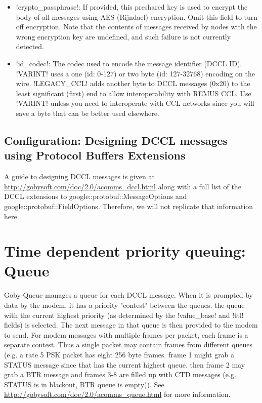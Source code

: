 \resetbvlinenumber

\begin{itemize}
\item !crypto_passphrase!: If provided, this preshared key is used to encrypt the body of all messages using AES (Rijndael) encryption. Omit this field to turn off encryption. Note that the contents of messages received by nodes with the wrong encryption key are undefined, and such failure is not currently detected.
\item !id_codec!: The codec used to encode the message identifier (DCCL ID). !VARINT! uses a one (id: 0-127) or two byte (id: 127-32768) encoding on the wire. !LEGACY_CCL! adds another byte to DCCL messages (0x20) to the least significant (first) end to allow interoperability with REMUS CCL. Use !VARINT! unless you need to interoperate with CCL networks since you will save a byte that can be better used elsewhere.
\end{itemize}

\subsection{Configuration: Designing DCCL messages using Protocol Buffers Extensions}

A guide to designing DCCL messages is given at \url{http://gobysoft.com/doc/2.0/acomms_dccl.html} along with a full list of the DCCL extensions to google::protobuf::MessageOptions and google::protobuf::FieldOptions. Therefore, we will not replicate that information here.

\section{Time dependent priority queuing: Queue} \label{sec:queue}

Goby-Queue manages a queue for each DCCL message. When it is prompted by data by the modem, it has a priority "contest" between the queues. the queue with the current highest priority (as determined by the !value_base! and !ttl! fields) is selected. The next message in that queue is then provided to the modem to send. For modem messages with multiple frames per packet, each frame is a separate contest. Thus a single packet may contain frames from different
 queues (e.g. a rate 5 PSK packet has eight 256 byte frames. frame 1 might grab a STATUS message since that has the current highest queue. then frame 2 may grab a BTR message and frames 3-8 are filled up with CTD messages (e.g. STATUS is in blackout, BTR queue is empty)). See \url{http://gobysoft.com/doc/2.0/acomms_queue.html} for more information.

